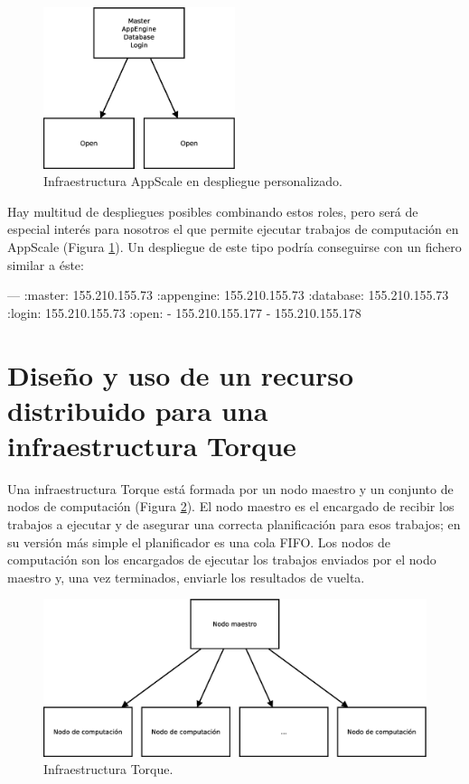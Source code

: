 \begin{figure} [!htbp]
  \centering
  \includegraphics[width=0.5\textwidth]{figuras/Arquitectura_AppScale.eps}
  \caption{Infraestructura AppScale en despliegue personalizado.}
\label{figure:arquitectura-appscale}
\end{figure}

Hay multitud de despliegues posibles combinando estos roles, pero será de especial interés para nosotros el que permite ejecutar trabajos de computación en AppScale (Figura \ref{figure:arquitectura-appscale}). Un despliegue de este tipo podría conseguirse con un fichero similar a éste:

\begin{yamlcode}
---
:master:    155.210.155.73
:appengine: 155.210.155.73
:database:  155.210.155.73
:login:     155.210.155.73
:open:
- 155.210.155.177
- 155.210.155.178
\end{yamlcode}


\section{Diseño y uso de un recurso distribuido para una infraestructura Torque}

Una infraestructura Torque está formada por un nodo maestro y un conjunto de nodos de computación (Figura \ref{figure:arquitectura-torque}). El nodo maestro es el encargado de recibir los trabajos a ejecutar y de asegurar una correcta planificación para esos trabajos; en su versión más simple el planificador es una cola FIFO. Los nodos de computación son los encargados de ejecutar los trabajos enviados por el nodo maestro y, una vez terminados, enviarle los resultados de vuelta.

\begin{figure} [!htbp]
  \centering
  \includegraphics[width=13.5cm]{figuras/Arquitectura_Torque.eps}
  \caption{Infraestructura Torque.}
\label{figure:arquitectura-torque}
\end{figure}

